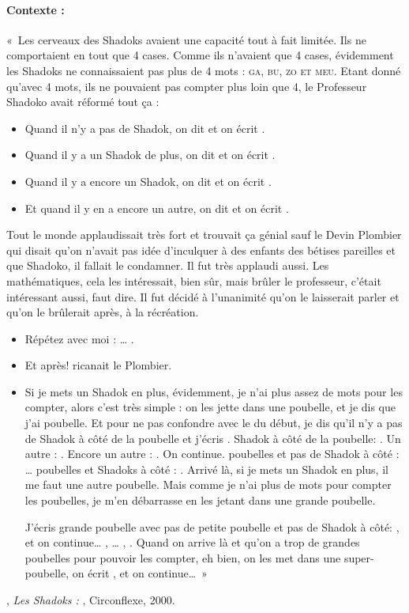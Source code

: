 \paragraph{Contexte :} «~Les cerveaux des Shadoks avaient une capacité tout à fait limitée.
Ils ne comportaient en tout que 4 cases. 
Comme ils n'avaient que 4 cases, évidemment les Shadoks ne connaissaient
pas plus de 4 mots :  \textsc{ga, bu, zo et meu}. 
Etant donné qu'avec 4 mots, ils ne pouvaient pas compter plus loin que 4, 
le Professeur Shadoko avait réformé tout ça : 
\begin{itemize} 
\item Quand il n'y a pas de Shadok, on dit \ga{} et on écrit \ga{}. 
\item Quand il y a un Shadok de plus, on dit \bu{} et on écrit \bu{}. 
\item Quand il y a encore un Shadok, on dit \zo{} et on écrit \zo{}. 
\item Et quand il y en a encore un autre, on dit \meu{} et on écrit \meu{}. 
\end{itemize} 
Tout le monde applaudissait très fort et trouvait ça génial sauf le Devin Plombier 
qui disait qu'on n'avait pas idée d'inculquer à des enfants des bétises pareilles 
et que Shadoko, il fallait le condamner. 
Il fut très applaudi aussi. Les mathématiques, 
cela les intéressait, bien sûr, mais brûler le professeur, c'était intéressant aussi, 
faut dire. 
Il fut décidé à l'unanimité qu'on le laisserait parler et qu'on le brûlerait après, 
à la récréation.
\begin{itemize}
\item Répétez avec moi : \meu{} \zo{} \bu{} \ga{}\ldots{} \ga{} \bu{} \zo{} \meu{}. 
\item Et après! ricanait le Plombier. 
\item Si je mets un Shadok en plus, évidemment, je n'ai plus assez 
de mots pour les compter, alors c'est très simple : on les jette dans une poubelle, 
et je dis que j'ai \bu{} poubelle. 
Et pour ne pas confondre avec le \bu{} du début, 
je dis qu'il n'y a pas de Shadok à côté de la poubelle et j'écris \bu{} \ga{}. 
\bu{} Shadok à côté de la poubelle: \bu{} \bu{}. Un autre : \bu{}  \zo{}. Encore un autre : \bu{} \meu{}. 
On continue. \zo{} poubelles et pas de Shadok à côté : \zo{} \ga{}\ldots{} 
\meu{} poubelles et \meu{} Shadoks à côté : \meu{} \meu{}. 
Arrivé là, si je mets un Shadok en plus, il me faut une autre poubelle. 
Mais comme je n'ai plus de mots pour compter les poubelles, je m'en débarrasse 
en les jetant dans une grande poubelle. 

J'écris \bu{} grande poubelle avec pas de petite poubelle 
et pas de Shadok à côté: \bu{} \ga{} \ga{}, et on continue\ldots{} \bu{} \ga{} \bu{},
\bu{} \ga{} \zo{}\ldots{} \meu{} \meu{} \zo{},  \meu{} \meu{} \meu{}.
Quand on arrive là et qu'on a trop de grandes poubelles pour pouvoir les compter, 
eh bien, on les met dans une super-poubelle, on écrit \bu{} \ga{} \ga{} \ga{}, 
et on continue\ldots{}~»
\end{itemize}
\mbox{}\hfill{}, \emph{Les Shadoks : \ga{} \bu{} \zo{} \meu{}},
Circonflexe, 2000.

